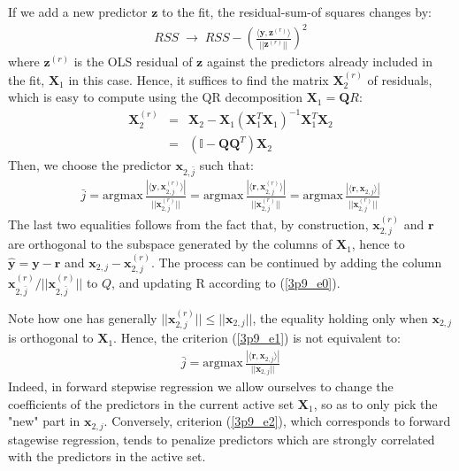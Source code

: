 

If we add a new predictor $\mathbf{z}$ to the fit, the residual-sum-of squares changes by:
\begin{eqnarray*}
    RSS \; \longrightarrow \; RSS - \left( \frac{ \langle \mathbf{y}, \mathbf{z}^{(r)} \rangle}{||\mathbf{z}^{(r)} ||} \right) ^2
\end{eqnarray*}
where $ \mathbf{z}^{(r)}$ is the OLS residual of $ \mathbf{z}$ against the predictors already included in the fit, $\mathbf{X}_1$ in this case. Hence, it suffices to find the matrix $\mathbf{X}_{2}^{(r)}$ of residuals,
which is easy to compute using the QR decomposition $\mathbf{X}_1 =  \mathbf{Q}R$:
\begin{eqnarray} \label{3p9_e0}
\mathbf{X}_{2}^{(r)} & = & \mathbf{X}_2 - \mathbf{X}_1 \left( \mathbf{X}_1^T \mathbf{X}_1 \right)^{-1} \mathbf{X}_1^T \mathbf{X}_2 \\
& = & \left( \mathbb{I} - \mathbf{Q} \mathbf{Q}^T \right) \mathbf{X}_2
\end{eqnarray}
Then, we choose the predictor $\mathbf{x}_{2, \bar{j}}$ such that:
\begin{eqnarray} \label{3p9_e1}
\bar{j} = \textrm{argmax}\, \frac{| \langle \mathbf{y}, \mathbf{x}_{2, j}^{(r)} \rangle |}{||\mathbf{x}_{2, j}^{(r)}||} = \textrm{argmax}\, \frac{| \langle \mathbf{r}, \mathbf{x}_{2, j}^{(r)} \rangle |}{||\mathbf{x}_{2, j}^{(r)}||} = \textrm{argmax}\, \frac{| \langle \mathbf{r}, \mathbf{x}_{2, j} \rangle |}{||\mathbf{x}_{2, j}^{(r)}||}
\end{eqnarray}
The last two equalities follows from the fact that, by construction, $\mathbf{x}_{2, j}^{(r)}$ and $\mathbf{r}$ are orthogonal to the subspace generated by the columns of $\mathbf{X}_1$, hence to $\hat{\mathbf{y}} = \mathbf{y} - \mathbf{r}$ and $\mathbf{x}_{2, j} - \mathbf{x}_{2, j}^{(r)}$. The
process can be continued by adding the column $\mathbf{x}_{2, \bar{j}}^{(r)} / ||\mathbf{x}_{2, \bar{j}}^{(r)}||$ to $Q$, and updating R according to (\ref{3p9_e0}).

Note how one has generally $||\mathbf{x}_{2, j}^{(r)}|| \leq ||\mathbf{x}_{2, j}||$, the equality holding 
only when $\mathbf{x}_{2, j}$ is orthogonal to $\mathbf{X}_1$. Hence, the criterion (\ref{3p9_e1}) is not equivalent to:
\begin{eqnarray} \label{3p9_e2}
\bar{j} = \textrm{argmax}\, \frac{| \langle \mathbf{r}, \mathbf{x}_{2, j} \rangle |}{||\mathbf{x}_{2, j}||}
\end{eqnarray}
Indeed, in forward stepwise regression we allow ourselves to change the coefficients of the predictors in the
current active set $ \mathbf{X}_1$, so as to only pick the "new" part in $\mathbf{x}_{2, j}$. Conversely, criterion (\ref{3p9_e2}), which corresponds to forward stagewise regression, tends to penalize predictors
which are strongly correlated with the predictors in the active set.